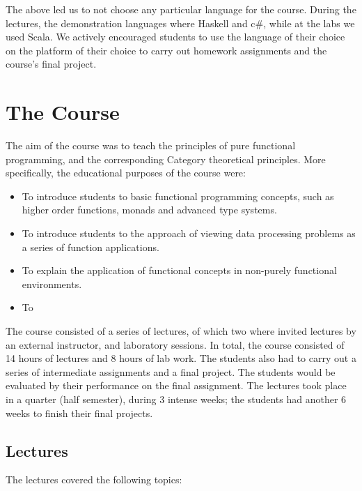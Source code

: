 \documentclass[conference]{IEEEtran}
\begin{document}
The above led us to not choose any particular language for the course.  During
the lectures, the demonstration languages where Haskell and {\sc c\#}, while at
the labs we used Scala. We actively encouraged students to use the language of
their choice on the platform of their choice to carry out homework assignments
and the course's final project.

\section{The Course}

The aim of the course was to teach the principles of pure functional
programming, and the corresponding Category theoretical principles. 
More specifically, the educational purposes of the course were:

\begin{itemize}

  \item To introduce students to basic functional programming concepts, such
    as higher order functions, monads and advanced type systems.

  \item To introduce students to the approach of viewing data processing
    problems as a series of function applications.

  \item To explain the application of functional concepts in non-purely
    functional environments.

  \item To 

\end{itemize}

The course consisted of a series of lectures, of which two where invited
lectures by an external instructor, and laboratory sessions. In total, the
course consisted of 14 hours of lectures and 8 hours of lab work.
The students
also had to carry out a series of intermediate assignments and a final project.
The students would be evaluated by their performance on the final assignment. 
The lectures took place in a quarter (half semester), during 3 intense 
weeks; the students had another 6 weeks to finish their final projects.

\subsection{Lectures}

The lectures covered the following topics:
\end{document}
